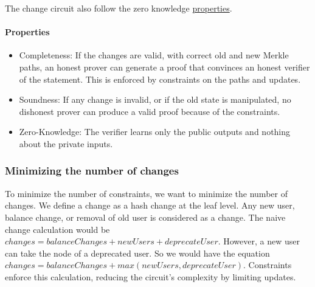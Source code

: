The change circuit also follow the zero knowledge \hyperref[subsec:zkp]{properties}. 
\paragraph{Properties}
\begin{itemize}
   \item Completeness: If the changes are valid, with correct old and new Merkle paths, an honest prover can generate a proof that convinces an honest verifier of the statement. This is enforced by constraints on the paths and updates.
   \item Soundness: If any change is invalid, or if the old state is manipulated, no dishonest prover can produce a valid proof because of the constraints.
   \item Zero-Knowledge: The verifier learns only the public outputs and nothing about the private inputs.
   \end{itemize}

\subsubsection{Minimizing the number of changes}
To minimize the number of constraints, we want to minimize the number of changes.
We define a change as a hash change at the leaf level. Any new user, balance change, or removal of old user is considered as a change.
The naive change calculation would be $changes = balanceChanges + newUsers + deprecateUser$.
However, a new user can take the node of a deprecated user. So we would have the equation $changes = balanceChanges + max(newUsers, deprecateUser)$. 
Constraints enforce this calculation, reducing the circuit's complexity by limiting updates.

